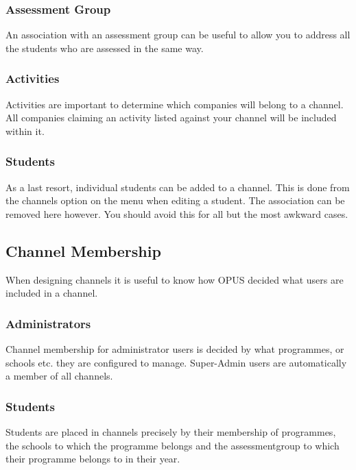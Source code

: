 \documentclass[12 pt]{book}
\begin{document}
\subsubsection{Assessment Group}

An association with an assessment group can be useful to allow you to address
all the students who are assessed in the same way.

\subsubsection{Activities}

Activities are important to determine which companies will belong to a channel.
All companies claiming an activity listed against your channel will be
included within it.

\subsubsection{Students}

As a last resort, individual students can be added to a channel. This is done
from the channels option on the menu when editing a student. The association
can be removed here however. You should avoid this for all but the most
awkward cases.

\subsection{Channel Membership}

When designing channels it is useful to know how OPUS decided what users are
included in a channel.

\subsubsection{Administrators}

Channel membership for administrator users is decided by what programmes, or
schools etc. they are configured to manage. Super-Admin users are automatically
a member of all channels.

\subsubsection{Students}

Students are placed in channels precisely by their membership of programmes,
the schools to which the programme belongs and the assessmentgroup to which
their programme belongs to in their year.
\end{document}
